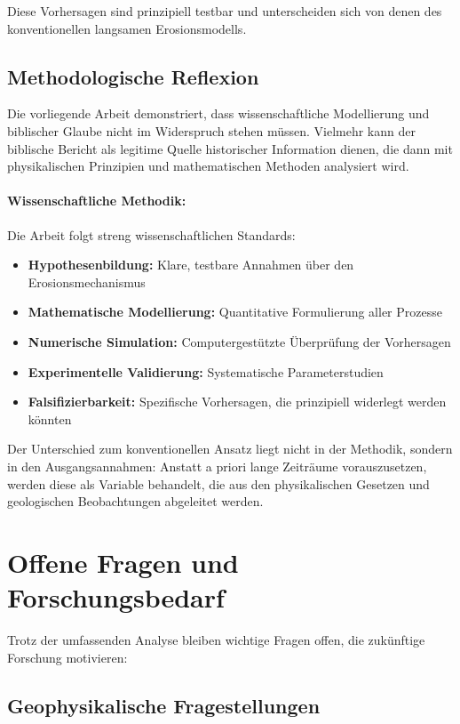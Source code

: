 ﻿\documentclass[12pt,a4paper]{report}
\begin{document}
Diese Vorhersagen sind prinzipiell testbar und unterscheiden sich von denen des konventionellen langsamen Erosionsmodells.

\subsection{Methodologische Reflexion}

Die vorliegende Arbeit demonstriert, dass wissenschaftliche Modellierung und biblischer Glaube nicht im Widerspruch stehen müssen. Vielmehr kann der biblische Bericht als legitime Quelle historischer Information dienen, die dann mit physikalischen Prinzipien und mathematischen Methoden analysiert wird.

\paragraph{Wissenschaftliche Methodik:}
Die Arbeit folgt streng wissenschaftlichen Standards:
\begin{itemize}
	\item \textbf{Hypothesenbildung:} Klare, testbare Annahmen über den Erosionsmechanismus
	\item \textbf{Mathematische Modellierung:} Quantitative Formulierung aller Prozesse
	\item \textbf{Numerische Simulation:} Computergestützte Überprüfung der Vorhersagen
	\item \textbf{Experimentelle Validierung:} Systematische Parameterstudien
	\item \textbf{Falsifizierbarkeit:} Spezifische Vorhersagen, die prinzipiell widerlegt werden könnten
\end{itemize}

Der Unterschied zum konventionellen Ansatz liegt nicht in der Methodik, sondern in den Ausgangsannahmen: Anstatt a priori lange Zeiträume vorauszusetzen, werden diese als Variable behandelt, die aus den physikalischen Gesetzen und geologischen Beobachtungen abgeleitet werden.

\section{Offene Fragen und Forschungsbedarf}

Trotz der umfassenden Analyse bleiben wichtige Fragen offen, die zukünftige Forschung motivieren:

\subsection{Geophysikalische Fragestellungen}
\end{document}
